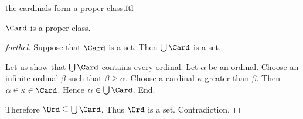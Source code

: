 \documentclass{naproche-library}
\begin{document}
\begin{smodule}[title=The Cardinals Form a Proper Class -- Cantor's First Paradox]{the-cardinals-form-a-proper-class.ftl}

\begin{theorem*}[forthel,title=Cantor's First Paradox,id=cantor_paradox_1]
  $\Card$ is a proper class.
\end{theorem*}
\begin{proof}[forthel]
  Suppose that $\Card$ is a set.
  Then $\bigcup \Card$ is a set.

  Let us show that $\bigcup \Card$ contains every ordinal.
    Let $\alpha$ be an ordinal.
    Choose an infinite ordinal $\beta$ such that $\beta \geq \alpha$.
    Choose a cardinal $\kappa$ greater than $\beta$.
    Then $\alpha \in \kappa \in \Card$.
    Hence $\alpha \in \bigcup \Card$.
  End.

  Therefore $\Ord \subseteq \bigcup \Card$.
  Thus $\Ord$ is a set.
  Contradiction.
\end{proof}
\end{smodule}
\end{document}
